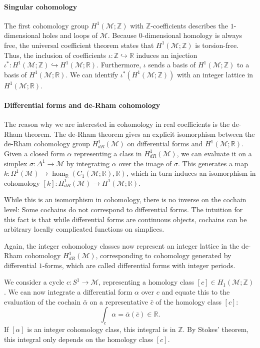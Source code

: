 \documentclass[a4paper,11pt, DIV=10]{scrartcl}
\numberwithin{equation}{section}
\theoremstyle{definition}
\theoremstyle{remark}
\newcommand{\Z}{\mathbb{Z}}
\newcommand{\R}{\mathbb{R}}
\newcommand{\mc}[1]{\mathcal{#1}}
\begin{document}
	\paragraph{Singular cohomology}
	The first cohomology group $H^1(\mc{M};\Z)$ with $\Z$-coefficients describes the $1$-dimensional holes and loops of $\mc{M}$.
	Because $0$-dimensional homology is always free, the universal coefficient theorem states that $H^1(\mc{M};\Z)$ is torsion-free.
	Thus, the inclusion of coefficients $\iota\colon \Z\hookrightarrow \R$ induces an injection $\iota^*\colon H^1(\mc{M};\Z)\hookrightarrow H^1(\mc{M};\R)$.
	Furthermore, $\iota$ sends a basis of $H^1(\mc{M};\Z)$ to a basis of $H^1(\mc{M};\R)$.
	We can identify $\iota^*(H^1(\mc{M};\Z))$ with an integer lattice in $H^1(\mc{M};\R)$.

	\paragraph{Differential forms and de-Rham cohomology}
	The reason why we are interested in cohomology in real coefficients is the de-Rham theorem.
	The de-Rham theorem gives an explicit isomorphism between the de-Rham cohomology group $H^1_{dR}(\mc{M})$ on differential forms and $H^1(\mc{M};\R)$.
	Given a closed form $\alpha$ representing a class in $H^1_{dR}(\mc{M})$, we can evaluate it on a simplex $\sigma\colon \Delta^1\to \mc{M}$ by integrating $\alpha$ over the image of $\sigma$.
	This generates a map $k\colon \Omega^1(\mc{M})\to \hom_\R (C_1(\mc{M};\R),\R)$,
	which in turn induces an isomorphism in cohomology $[k]\colon H^1_{dR}(\mc{M})\to H^1(\mc{M};\R)$.

	While this is an isomorphism in cohomology, there is no inverse on the cochain level:
	Some cochains do not correspond to differential forms.
	The intuition for this fact is that while differential forms are continuous objects, cochains can be arbitrary locally complicated functions on simplices.

	Again, the integer cohomology classes now represent an integer lattice in the de-Rham cohomology $H^1_{dR}(\mc{M})$, corresponding to cohomology generated by differential $1$-forms, which are called differential forms with integer periods.
	
	We consider a cycle $c\colon S^1\to \mc{M}$, representing a homology class $[c]\in H_1(\mc{M};\Z)$.
	We can now integrate a differential form $\alpha$ over $c$ and equate this to the evaluation of the cochain $\bar{\alpha}$ on a representative $\bar{c}$ of the homology class $[c]$:
		\begin{equation}
		\int_c \alpha = \bar{\alpha}(\bar{c})\in \R.
		\end{equation}
	If $[\alpha]$ is an integer cohomology class, this integral is in $\Z$.
	By Stokes' theorem, this integral only depends on the homology class $[c]$.
\end{document}
